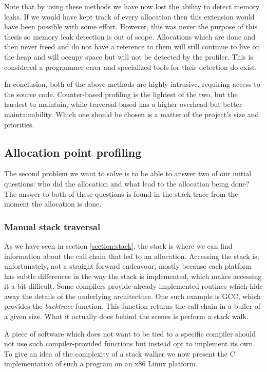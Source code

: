 Note that by using these methods we have now lost the ability to detect memory leaks. If we would have kept track of every allocation then this extension would have been possible with some effort. However, this was never the purpose of this thesis so memory leak detection is out of scope. Allocations which are done and then never freed and do not have a reference to them will still continue to live on the heap and will occupy space but will not be detected by the profiler. This is considered a programmer error and specialized tools for their detection do exist.

In conclusion, both of the above methods are highly intrusive, requiring access to the source code. Counter-based profiling is the lightest of the two, but the hardest to maintain, while traversal-based has a higher overhead but better maintainability. Which one should be chosen is a matter of the project's size and priorities.

\subsection{Allocation point profiling}
\label{subsection:allocationpointprofiling}

The second problem we want to solve is to be able to answer two of our initial questions: who did the allocation and what lead to the allocation being done? The answer to both of these questions is found in the stack trace from the moment the allocation is done.

\subsubsection{Manual stack traversal}
\label{subsubsection:manualstacktraversal}

As we have seen in section \ref{section:stack}, the stack is where we can find information about the call chain that led to an allocation. Accessing the stack is, unfortunately, not a straight forward endeavour, mostly because each platform has subtle differences in the way the stack is implemented, which makes accessing it a bit difficult. Some compilers provide already implemented routines which hide away the details of the underlying architecture. One such example is GCC, which provides the \textit{backtrace} function. This function returns the call chain in a buffer of a given size. What it actually does behind the scenes is perform a stack walk.

A piece of software which does not want to be tied to a specific compiler should not use such compiler-provided functions but instead opt to implement its own. To give an idea of the complexity of a stack walker we now present the C implementation of such a program on an x86 Linux platform.

